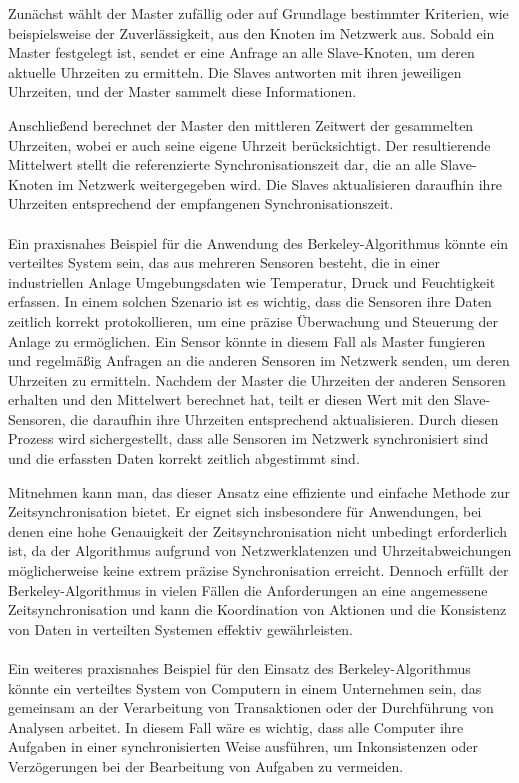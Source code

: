 Zunächst wählt der Master zufällig oder auf Grundlage bestimmter Kriterien, wie beispielsweise der Zuverlässigkeit, aus den Knoten im Netzwerk aus. Sobald ein Master festgelegt ist, sendet er eine Anfrage an alle Slave-Knoten, um deren aktuelle Uhrzeiten zu ermitteln. Die Slaves antworten mit ihren jeweiligen Uhrzeiten, und der Master sammelt diese Informationen.

Anschließend berechnet der Master den mittleren Zeitwert der gesammelten Uhrzeiten, wobei er auch seine eigene Uhrzeit berücksichtigt. Der resultierende Mittelwert stellt die referenzierte Synchronisationszeit dar, die an alle Slave-Knoten im Netzwerk weitergegeben wird. Die Slaves aktualisieren daraufhin ihre Uhrzeiten entsprechend der empfangenen Synchronisationszeit.
\\\\
Ein praxisnahes Beispiel für die Anwendung des Berkeley-Algorithmus könnte ein verteiltes System sein, das aus mehreren Sensoren besteht, die in einer industriellen Anlage Umgebungsdaten wie Temperatur, Druck und Feuchtigkeit erfassen. In einem solchen Szenario ist es wichtig, dass die Sensoren ihre Daten zeitlich korrekt protokollieren, um eine präzise Überwachung und Steuerung der Anlage zu ermöglichen.
Ein Sensor könnte in diesem Fall als Master fungieren und regelmäßig Anfragen an die anderen Sensoren im Netzwerk senden, um deren Uhrzeiten zu ermitteln. Nachdem der Master die Uhrzeiten der anderen Sensoren erhalten und den Mittelwert berechnet hat, teilt er diesen Wert mit den Slave-Sensoren, die daraufhin ihre Uhrzeiten entsprechend aktualisieren. Durch diesen Prozess wird sichergestellt, dass alle Sensoren im Netzwerk synchronisiert sind und die erfassten Daten korrekt zeitlich abgestimmt sind.

Mitnehmen kann man, das dieser Ansatz eine effiziente und einfache Methode zur Zeitsynchronisation bietet. Er eignet sich insbesondere für Anwendungen, bei denen eine hohe Genauigkeit der Zeitsynchronisation nicht unbedingt erforderlich ist, da der Algorithmus aufgrund von Netzwerklatenzen und Uhrzeitabweichungen möglicherweise keine extrem präzise Synchronisation erreicht. Dennoch erfüllt der Berkeley-Algorithmus in vielen Fällen die Anforderungen an eine angemessene Zeitsynchronisation und kann die Koordination von Aktionen und die Konsistenz von Daten in verteilten Systemen effektiv gewährleisten.
\\\\
Ein weiteres praxisnahes Beispiel für den Einsatz des Berkeley-Algorithmus könnte ein verteiltes System von Computern in einem Unternehmen sein, das gemeinsam an der Verarbeitung von Transaktionen oder der Durchführung von Analysen arbeitet. In diesem Fall wäre es wichtig, dass alle Computer ihre Aufgaben in einer synchronisierten Weise ausführen, um Inkonsistenzen oder Verzögerungen bei der Bearbeitung von Aufgaben zu vermeiden.

